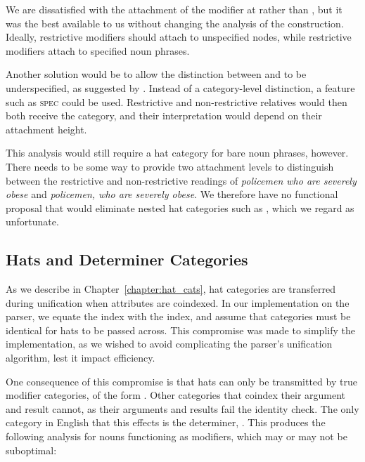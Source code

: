 We are dissatisfied with the attachment of the modifier at  rather than
, but it was the best available to us without changing the \ccgbank
analysis of the construction. Ideally, restrictive modifiers should attach to
unspecified  nodes, while restrictive modifiers attach to specified noun
phrases.

Another solution would be to allow the distinction between  and
 to be underspecified, as suggested by \citet{baldridge:02}. Instead of a
category-level distinction, a feature such as \textsc{spec} could be used.
Restrictive and non-restrictive relatives would then both receive the  category, and their interpretation would depend on their attachment height.

This analysis would still require a hat category for bare noun phrases, however.
There needs to be some way to provide two attachment levels to distinguish
between the restrictive and non-restrictive readings of \emph{policemen who are
severely obese} and \emph{policemen, who are severely obese}. We
therefore have no functional proposal  that would eliminate nested hat
categories such as , which we regard as unfortunate.

\subsection{Hats and Determiner Categories}
\label{sec:hat_determiners}


As we describe in Chapter~\ref{chapter:hat_cats}, hat categories are transferred
during unification when \hatsc attributes are coindexed.
In our implementation on the \candc parser, we equate the \hatsc index with the \headsc
index, and assume that categories must be identical for hats to be passed across.
This compromise was made to simplify the implementation, as we wished to avoid
complicating the parser's unification algorithm, lest it impact efficiency.

One consequence of this compromise is that hats can only be transmitted by true
modifier categories, of the form . Other categories that coindex their
argument and result cannot, as their arguments and results fail the identity check.
The only category in English that this effects is the determiner, .
This produces the following analysis for nouns functioning as modifiers, which
may or may not be suboptimal:

\begin{center}
\end{center}

